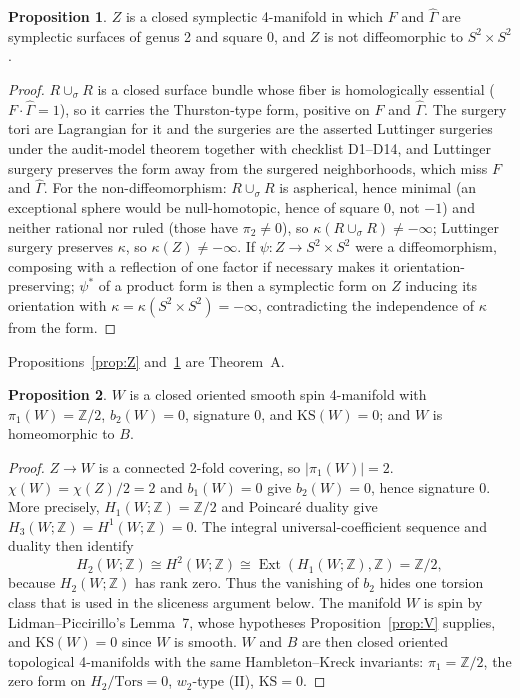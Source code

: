 \documentclass[11pt]{article}
\newcommand{\Z}{\mathbb{Z}}
\newcommand{\pione}{\pi_1}
\newcommand{\Ghat}{\widehat{\Gamma}}
\theoremstyle{definition}
\newtheorem{proposition}{Proposition}[section]
\begin{document}
\begin{proposition}\label{prop:Znot}
$Z$ is a closed symplectic 4-manifold in which $F$ and $\Ghat$ are
symplectic surfaces of genus 2 and square 0, and $Z$ is not
diffeomorphic to $S^2\times S^2$.
\end{proposition}

\begin{proof}
$R\cup_\sigma R$ is a closed surface bundle whose fiber is homologically
essential ($F\cdot\Ghat=1$), so it carries the Thurston-type form,
positive on $F$ and $\Ghat$. The surgery tori are Lagrangian for it and
the surgeries are the asserted Luttinger surgeries under the audit-model
theorem together with checklist D1--D14, and
Luttinger surgery preserves the form
away from the surgered neighborhoods, which miss $F$ and $\Ghat$. For the
non-diffeomorphism: $R\cup_\sigma R$ is aspherical, hence minimal (an
exceptional sphere would be null-homotopic, hence of square $0$, not
$-1$) and neither rational nor ruled (those have $\pi_2\neq0$), so
$\kappa(R\cup_\sigma R)\ne-\infty$; Luttinger surgery preserves $\kappa$,
so $\kappa(Z)\ne-\infty$. If $\psi\colon Z\to S^2\times S^2$ were a
diffeomorphism, composing with a reflection of one factor if necessary
makes it orientation-preserving; $\psi^*$ of a product form is then a
symplectic form on $Z$ inducing its orientation with $\kappa=
\kappa(S^2\times S^2)=-\infty$, contradicting the independence of
$\kappa$ from the form.
\end{proof}

Propositions~\ref{prop:Z} and~\ref{prop:Znot} are Theorem~A.

\begin{proposition}\label{prop:W}
$W$ is a closed oriented smooth spin 4-manifold with $\pione(W)=\Z/2$,
$b_2(W)=0$, signature $0$, and $\mathrm{KS}(W)=0$; and $W$ is
homeomorphic to $B$.
\end{proposition}

\begin{proof}
$Z\to W$ is a connected 2-fold covering, so $|\pione(W)|=2$.
$\chi(W)=\chi(Z)/2=2$ and $b_1(W)=0$ give $b_2(W)=0$, hence signature
$0$.  More precisely, $H_1(W;\Z)=\Z/2$ and Poincar\'e duality give
$H_3(W;\Z)=H^1(W;\Z)=0$.  The integral universal-coefficient sequence and
duality then identify
\[
 H_2(W;\Z)\cong H^2(W;\Z)
 \cong \operatorname{Ext}(H_1(W;\Z),\Z)=\Z/2,
\]
because $H_2(W;\Z)$ has rank zero.  Thus the vanishing of $b_2$ hides one
torsion class that is used in the sliceness argument below.  The manifold
$W$ is spin by Lidman--Piccirillo's Lemma~7, whose hypotheses
Proposition~\ref{prop:V} supplies, and $\mathrm{KS}(W)=0$ since $W$ is
smooth. $W$ and $B$ are then closed oriented topological 4-manifolds with
the same Hambleton--Kreck invariants: $\pione=\Z/2$, the zero form on
$H_2/\mathrm{Tors}=0$, $w_2$-type (II), $\mathrm{KS}=0$.
\end{proof}
\end{document}
